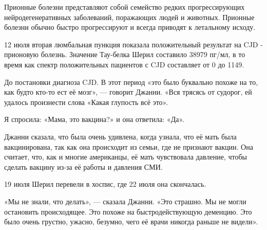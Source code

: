 Прионные болезни представляют собой семейство редких прогрессирующих
нейродегенеративных заболеваний, поражающих людей и животных. Прионные болезни
обычно быстро прогрессируют и всегда приводят к летальному исходу.

12 июля вторая люмбальная пункция показала положительный результат на CJD -
прионовую болезнь. Значение Тау-белка Шерил составило 38979 пг/мл, в то время
как спектр положительных пациентов с CJD составляет от 0 до 1149.

До постановки диагноза CJD.  В этот период «это было буквально похоже на то, как
будто кто-то ест её мозг», — говорит Джанни. «Вся трясясь от судорог, ей удалось
произнести слова «Какая глупость всё это».

Я спросила: «Мама, это вакцина?» и она ответила: «Да».

Джанни сказала, что была очень удивлена, когда узнала, что её мать была
вакцинирована, так как она происходит из семьи, где не признают вакцин. Она
считает, что, как и многие американцы, её мать чувствовала давление, чтобы
сделать вакцину из-за её работы и давления СМИ.

19 июля Шерил перевели в хоспис, где 22 июля она скончалась.

«Мы не знали, что делать», — сказала Джанни. «Это страшно. Мы не могли
остановить происходящее. Это похоже на быстродействующую деменцию. Это было
очень грустно, ужасно, безумно, чего её врачи никогда раньше не видели».

